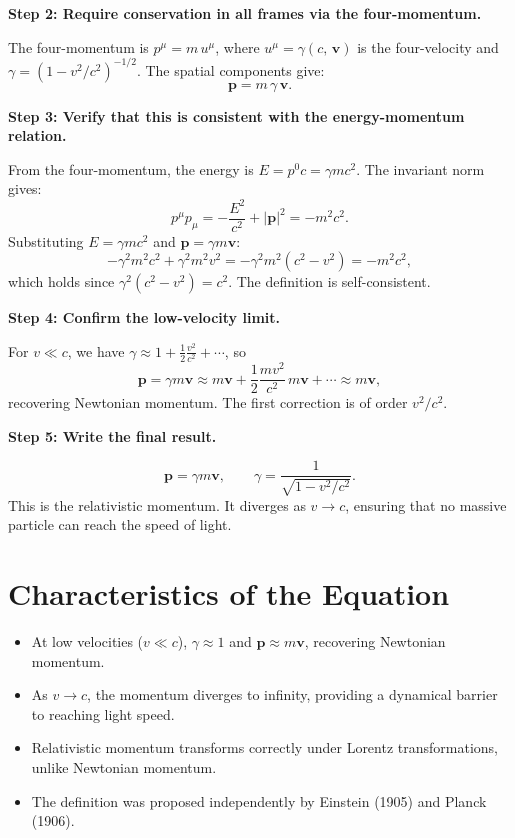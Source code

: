 \textbf{Step 2: Require conservation in all frames via the four-momentum.}

The four-momentum is $p^\mu = m\,u^\mu$, where $u^\mu = \gamma(c,\,\mathbf{v})$ is the four-velocity and $\gamma = (1 - v^2/c^2)^{-1/2}$. The spatial components give:
\begin{equation}
\mathbf{p} = m\,\gamma\,\mathbf{v}.
\end{equation}

\textbf{Step 3: Verify that this is consistent with the energy-momentum relation.}

From the four-momentum, the energy is $E = p^0 c = \gamma mc^2$. The invariant norm gives:
\begin{equation}
p^\mu p_\mu = -\frac{E^2}{c^2} + |\mathbf{p}|^2 = -m^2c^2.
\end{equation}
Substituting $E = \gamma mc^2$ and $\mathbf{p} = \gamma m\mathbf{v}$:
\begin{equation}
-\gamma^2 m^2 c^2 + \gamma^2 m^2 v^2 = -\gamma^2 m^2(c^2 - v^2) = -m^2c^2,
\end{equation}
which holds since $\gamma^2(c^2 - v^2) = c^2$. The definition is self-consistent.

\textbf{Step 4: Confirm the low-velocity limit.}

For $v \ll c$, we have $\gamma \approx 1 + \frac{1}{2}\frac{v^2}{c^2} + \cdots$, so
\begin{equation}
\mathbf{p} = \gamma m\mathbf{v} \approx m\mathbf{v} + \frac{1}{2}\frac{mv^2}{c^2}\,m\mathbf{v} + \cdots \approx m\mathbf{v},
\end{equation}
recovering Newtonian momentum. The first correction is of order $v^2/c^2$.

\textbf{Step 5: Write the final result.}

\begin{equation}
\boxed{\mathbf{p} = \gamma m\mathbf{v}, \qquad \gamma = \frac{1}{\sqrt{1 - v^2/c^2}}.}
\end{equation}
This is the relativistic momentum. It diverges as $v \to c$, ensuring that no massive particle can reach the speed of light.

\section*{Characteristics of the Equation}

\begin{itemize}
    \item At low velocities ($v \ll c$), $\gamma \approx 1$ and $\mathbf{p} \approx m\mathbf{v}$, recovering Newtonian momentum.
    \item As $v \to c$, the momentum diverges to infinity, providing a dynamical barrier to reaching light speed.
    \item Relativistic momentum transforms correctly under Lorentz transformations, unlike Newtonian momentum.
    \item The definition was proposed independently by Einstein (1905) and Planck (1906).
\end{itemize}

